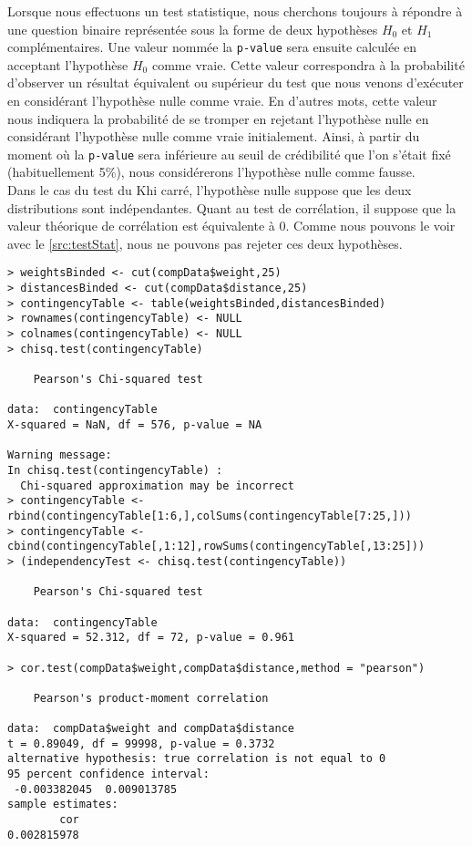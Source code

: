 Lorsque nous effectuons un test statistique, nous cherchons toujours à répondre à une question binaire représentée sous la forme de deux hypothèses $H_0$ et $H_1$ complémentaires. Une valeur nommée la \texttt{p-value} sera ensuite calculée en acceptant l'hypothèse $H_0$ comme vraie. Cette valeur correspondra à la probabilité d'observer un résultat équivalent ou supérieur du test que nous venons d'exécuter en considérant l'hypothèse nulle comme vraie. En d'autres mots, cette valeur nous indiquera la probabilité de se tromper en rejetant l'hypothèse nulle en considérant l'hypothèse nulle comme vraie initialement. Ainsi, à partir du moment où la \texttt{p-value} sera inférieure au seuil de crédibilité que l'on s'était fixé (habituellement 5\%), nous considérerons l'hypothèse nulle comme fausse. \\ 

Dans le cas du test du Khi carré, l'hypothèse nulle suppose que les deux distributions sont indépendantes. Quant au test de corrélation, il suppose que la valeur théorique de corrélation est équivalente à 0. Comme nous pouvons le voir avec le \autoref{src:testStat}, nous ne pouvons pas rejeter ces deux hypothèses. \\

\begin{lstlisting}[caption = Tests d'indépendance et de corrélation entre distributions,label=src:testStat]
> weightsBinded <- cut(compData$weight,25)
> distancesBinded <- cut(compData$distance,25)
> contingencyTable <- table(weightsBinded,distancesBinded)
> rownames(contingencyTable) <- NULL
> colnames(contingencyTable) <- NULL
> chisq.test(contingencyTable)

	Pearson's Chi-squared test

data:  contingencyTable
X-squared = NaN, df = 576, p-value = NA

Warning message:
In chisq.test(contingencyTable) :
  Chi-squared approximation may be incorrect
> contingencyTable <- rbind(contingencyTable[1:6,],colSums(contingencyTable[7:25,]))
> contingencyTable <- cbind(contingencyTable[,1:12],rowSums(contingencyTable[,13:25]))
> (independencyTest <- chisq.test(contingencyTable))

	Pearson's Chi-squared test

data:  contingencyTable
X-squared = 52.312, df = 72, p-value = 0.961

> cor.test(compData$weight,compData$distance,method = "pearson")

	Pearson's product-moment correlation

data:  compData$weight and compData$distance
t = 0.89049, df = 99998, p-value = 0.3732
alternative hypothesis: true correlation is not equal to 0
95 percent confidence interval:
 -0.003382045  0.009013785
sample estimates:
        cor 
0.002815978 
\end{lstlisting}

